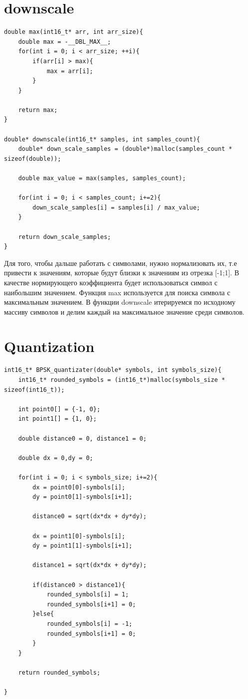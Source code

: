 \section{downscale}

\begin{lstlisting}
double max(int16_t* arr, int arr_size){
    double max = -__DBL_MAX__;
    for(int i = 0; i < arr_size; ++i){
        if(arr[i] > max){
            max = arr[i];
        }
    }

    return max;
}

double* downscale(int16_t* samples, int samples_count){
    double* down_scale_samples = (double*)malloc(samples_count * sizeof(double));

    double max_value = max(samples, samples_count);

    for(int i = 0; i < samples_count; i+=2){
        down_scale_samples[i] = samples[i] / max_value;
    }

    return down_scale_samples;
}
\end{lstlisting}

Для того, чтобы дальше работать с символами, нужно нормализовать их, т.е привести к значениям, которые будут близки к значениям из
отрезка [-1;1]. В качестве нормирующего коэффициента будет использоваться символ с наибольшим значением. Функция max используется
для поиска символа с максимальным значением. В функции downscale итерируемся по исходному массиву символов и делим каждый на максимальное
значение среди символов.

\section{Quantization}

\begin{lstlisting}
int16_t* BPSK_quantizater(double* symbols, int symbols_size){
    int16_t* rounded_symbols = (int16_t*)malloc(symbols_size * sizeof(int16_t));

    int point0[] = {-1, 0};
    int point1[] = {1, 0};

    double distance0 = 0, distance1 = 0;

    double dx = 0,dy = 0;

    for(int i = 0; i < symbols_size; i+=2){
        dx = point0[0]-symbols[i];
        dy = point0[1]-symbols[i+1];

        distance0 = sqrt(dx*dx + dy*dy);

        dx = point1[0]-symbols[i];
        dy = point1[1]-symbols[i+1];

        distance1 = sqrt(dx*dx + dy*dy);

        if(distance0 > distance1){
            rounded_symbols[i] = 1;
            rounded_symbols[i+1] = 0;
        }else{
            rounded_symbols[i] = -1;
            rounded_symbols[i+1] = 0;
        }
    }

    return rounded_symbols;
    
}
\end{lstlisting}

